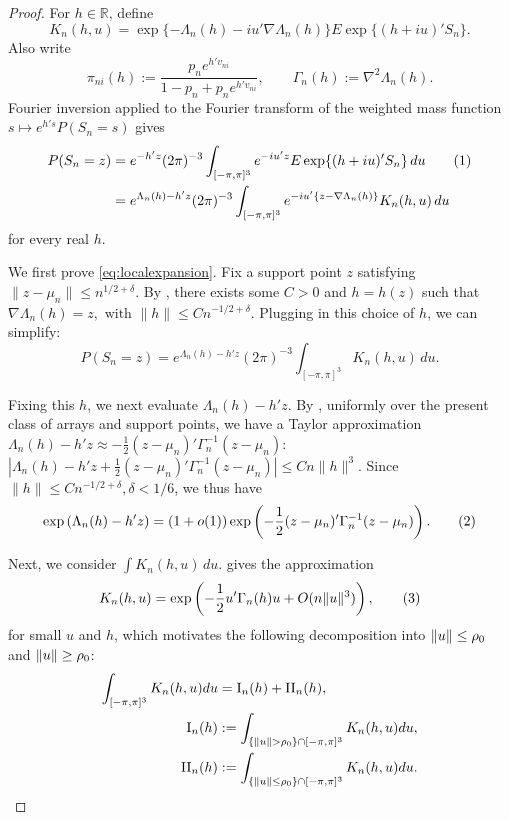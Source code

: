 \documentclass[12pt,reqno]{amsart}
\theoremstyle{theorem}
\theoremstyle{definition}
\newcommand\numberthis{\addtocounter{equation}{1}\tag{\theequation}}
\newcommand{\0}{\mathbf{0}}
\newcommand{\1}{\mathbf{1}}
\begin{document}
\begin{proof}
For $h\in \mathbb R$, define
\[
K_n(h,u)
=
\exp\{-\Lambda_n(h)-iu'\nabla\Lambda_n(h)\}
E\exp\{(h+iu)'S_n\}.
\]
Also write
\[
\pi_{ni}(h):=\frac{p_ne^{h'v_{ni}}}{1-p_n+p_ne^{h'v_{ni}}},
\qquad
\Gamma_n(h):=\nabla^2\Lambda_n(h).
\]
Fourier inversion applied to the Fourier transform of the weighted mass function
\(s\mapsto e^{h's}P(S_n=s)\) gives
\begin{align*}
P(S_n=z)
&=
e^{-h'z}(2\pi)^{-3}
\int_{[-\pi,\pi]^3}
e^{-iu'z}E\exp\{(h+iu)'S_n\}\,du \numberthis \label{eq:weighted-inversion} \\
&=
e^{\Lambda_n(h)-h'z}(2\pi)^{-3}
\int_{[-\pi,\pi]^3}
e^{-iu'\{z-\nabla\Lambda_n(h)\}}K_n(h,u)\,du
\end{align*}
for every real $h$.

We first prove \eqref{eq:localexpansion}.  Fix a support point \(z\) satisfying
\(\|z-\mu_n\|\le n^{1/2+\delta}\).  By , there exists some $C > 0$ and
\(h=h(z)\) such that
\(
\nabla\Lambda_n(h)=z, \text{ with  } \|h\|\le Cn^{-1/2+\delta}.
\)
Plugging in this choice of \(h\), we can simplify:
\[
P(S_n=z)
=
e^{\Lambda_n(h)-h'z}(2\pi)^{-3}
\int_{[-\pi,\pi]^3}K_n(h,u)\,du .
\]

Fixing this $h$, we next evaluate \(\Lambda_n(h)-h'z\).  By ,
uniformly
over the present class of arrays and support points, we have a Taylor approximation
$\Lambda_n(h) - h'z \approx -\frac{1}{2}(z-\mu_n)'\Gamma_n^{-1} (z-\mu_n)$:
\(
\left|
\Lambda_n(h)-h'z
+\frac12(z-\mu_n)'\Gamma_n^{-1}(z-\mu_n)
\right|
\le Cn\|h\|^3.
\)
Since \(\|h\|\le Cn^{-1/2+\delta}, \delta < 1/6\), we thus have
\[
\exp\pr{\Lambda_n(h) - h'z} = (1+o(1))\exp\pr{-\frac{1}{2} (z-\mu_n)' \Gamma_n^{-1}
(z-\mu_n)}. \numberthis
\label{eq:expansion_Lambda}
\]

Next, we consider $\int K_n(h,u)\,du$.   gives the
approximation \[
	K_n(h,u) = \exp\pr{-\frac{1}{2} u'\Gamma_n(h) u + O(n\norm{u}^3)}, \numberthis
	\label{eq:K-approx}
\]
for small $u$ and $h$,
which motivates the following decomposition into $\lVert u\rVert \le \rho_0$ and $\lVert u\rVert \ge
\rho_0$:
\begin{align*}
\int_{[-\pi, \pi]^3} K_n(h,u)du
& = \mathrm{I}_n(h)+\mathrm{II}_n(h),\\
\mathrm{I}_n(h)
&:=\int_{\{\lVert u\rVert > \rho_0\}\cap[-\pi,\pi]^3}  K_n(h,u)du,\\
\mathrm{II}_n(h)
&:=\int_{\{\lVert u\rVert \le \rho_0\}\cap[-\pi,\pi]^3}  K_n(h,u)du.
\end{align*}


\end{proof}
\end{document}

